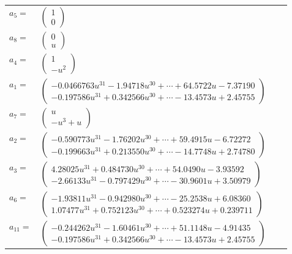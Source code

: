 \documentclass[1p]{elsarticle_modified}
\theoremstyle{definition}
\begin{document}
\begin{tabular}{m{7pt} m{180pt} m{7pt} m{180pt} }
\flushright $a_{5}=$&$\begin{pmatrix}1\\0\end{pmatrix}$ \\
\flushright $a_{8}=$&$\begin{pmatrix}0\\u\end{pmatrix}$ \\
\flushright $a_{4}=$&$\begin{pmatrix}1\\- u^2\end{pmatrix}$ \\
\flushright $a_{1}=$&$\begin{pmatrix}-0.0466763 u^{31}-1.94718 u^{30}+\cdots+64.5722 u-7.37190\\-0.197586 u^{31}+0.342566 u^{30}+\cdots-13.4573 u+2.45755\end{pmatrix}$ \\
\flushright $a_{7}=$&$\begin{pmatrix}u\\- u^3+u\end{pmatrix}$ \\
\flushright $a_{2}=$&$\begin{pmatrix}-0.590773 u^{31}-1.76202 u^{30}+\cdots+59.4915 u-6.72272\\-0.199663 u^{31}+0.213550 u^{30}+\cdots-14.7748 u+2.74780\end{pmatrix}$ \\
\flushright $a_{3}=$&$\begin{pmatrix}4.28025 u^{31}+0.484730 u^{30}+\cdots+54.0490 u-3.93592\\-2.66133 u^{31}-0.797429 u^{30}+\cdots-30.9601 u+3.50979\end{pmatrix}$ \\
\flushright $a_{6}=$&$\begin{pmatrix}-1.93811 u^{31}-0.942980 u^{30}+\cdots-25.2538 u+6.08360\\1.07477 u^{31}+0.752123 u^{30}+\cdots+0.523274 u+0.239711\end{pmatrix}$ \\
\flushright $a_{11}=$&$\begin{pmatrix}-0.244262 u^{31}-1.60461 u^{30}+\cdots+51.1148 u-4.91435\\-0.197586 u^{31}+0.342566 u^{30}+\cdots-13.4573 u+2.45755\end{pmatrix}$ \\

\end{tabular}
\end{document}
